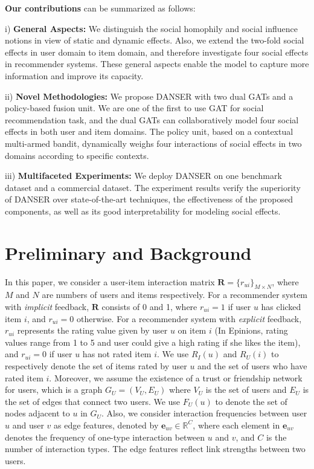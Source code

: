 \documentclass[sigconf]{acmart}
\begin{document}
\textbf{Our contributions} can be summarized as follows:

i) \textbf{General Aspects:} We distinguish the social homophily and social influence notions in view of static and dynamic effects. 
Also, we extend the two-fold social effects in user domain to item domain, and therefore investigate four social effects in recommender systems. 
These general aspects enable the model to capture more information and improve its capacity.

ii) \textbf{Novel Methodologies:} We propose DANSER with two dual GATs and a policy-based fusion unit. {We are one of the first to use GAT for social recommendation task}, and
the dual GATs can collaboratively model four social effects in both user and item domains. 
The policy unit, based on a contextual multi-armed bandit, dynamically weighs four interactions of social effects in two domains according to specific contexts. 



iii) \textbf{Multifaceted Experiments:} We deploy DANSER on one benchmark dataset and a commercial dataset. 
The experiment results verify the superiority of DANSER over state-of-the-art techniques, the effectiveness of the proposed components, as well as its good interpretability for modeling social effects.
\vspace{-5pt}
\section{Preliminary and Background}

In this paper, we consider a user-item interaction matrix $\mathbf R=\{r_{ui}\}_{M\times N}$, where $M$ and $N$ are numbers of users and items respectively. 
For a recommender system with \emph{implicit} feedback, $\mathbf R$ consists of 0 and 1, where $r_{ui}=1$ if user $u$ has clicked item $i$, and $r_{ui}=0$ otherwise. 
For a recommender system with \emph{explicit} feedback, $r_{ui}$ represents the rating value given by user $u$ on item $i$ (In Epinions, rating values range from 1 to 5 and user could give a high rating if she likes the item), and $r_{ui}=0$ if user $u$ has not rated item $i$. 
We use $R_I(u)$ and $R_U(i)$ to respectively denote the set of items rated by user $u$ and the set of users who have rated item $i$. 
Moreover, we assume the existence of a trust or friendship network for users, which is a graph $G_U=(V_U, E_U)$ where $V_U$ is the set of users and $E_U$ is the set of edges that connect two users.
We use $F_U(u)$ to denote the set of nodes adjacent to $u$ in $G_U$.
Also, we consider interaction frequencies between user $u$ and user $v$ as edge features, denoted by $\mathbf e_{uv}\in \mathbb R^{C}$, where each element in $\mathbf e_{uv}$ denotes the frequency of one-type interaction between $u$ and $v$, and $C$ is the number of interaction types. The edge features reflect link strengths between two users.
\end{document}
